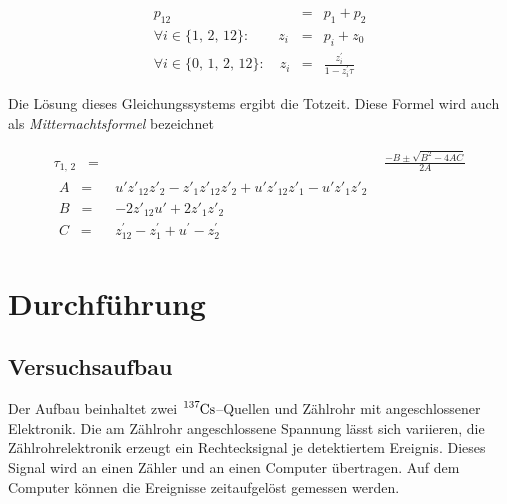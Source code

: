 \documentclass[12pt,a4paper]{scrartcl}
\numberwithin{equation}{section} %
\newcommand{\eqspaced}{\ensuremath{\;\;=\;\;}} %
\begin{document}
\begin{eqnarray}
	p_{12} &=& p_1 + p_2 \\
	\forall i\in\{1,\,2,\,12\}:\qquad
		z_i &=& p_i + z_0 \\
	\forall i\in\{0,\,1,\,2,\,12\}:\quad
		z_i &=& \frac{z^\prime_i}{1-z^\prime_i \tau}
\end{eqnarray}

\noindent
Die Lösung dieses Gleichungssystems ergibt die Totzeit. Diese Formel wird auch als \emph{Mitternachtsformel} bezeichnet

\begin{align}
	\tau _{1,\,2} \eqspaced& \frac{-B \pm \sqrt{B^2 - 4AC}}{2A} \label{eq:Totzeit Mitternachtsformel} \\
	\begin{split}
		A \eqspaced& u'z'_{12}z'_2 - z'_1z'_12z'_2 + u'z'_{12}z'_1 - u'z'_1z'_2 \\
		B \eqspaced& -2z'_{12}u' + 2z'_1z'_2 \\
		C \eqspaced& z^\prime _{12} - z^\prime _1 + u^\prime  - z^\prime _2
	\end{split}
\end{align}

\clearpage
\hypertarget{durchfuxfchrung}{%
\section{Durchführung}\label{durchfuxfchrung}}
\subsection{Versuchsaufbau}
Der Aufbau beinhaltet zwei $\ce{^{137}Cs}$--Quellen und Zählrohr mit angeschlossener Elektronik. Die am Zählrohr angeschlossene Spannung lässt sich variieren, die Zählrohrelektronik erzeugt ein Rechtecksignal je detektiertem Ereignis. Dieses Signal wird an einen Zähler und an einen Computer übertragen. Auf dem Computer können die Ereignisse zeitaufgelöst gemessen werden.
\end{document}
